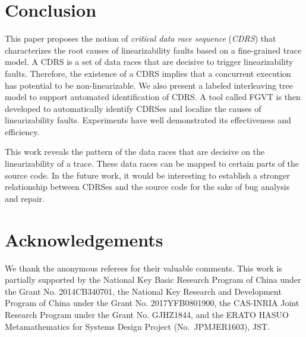 \documentclass[runningheads]{llncs}
\begin{document}

\section{Conclusion}\label{sec:conclusion}
This paper proposes the notion of \textit{critical data race sequence} (\textit{CDRS}) that characterizes the root causes of linearizability faults based on a fine-grained trace model. A CDRS is a set of data races that are decisive to trigger linearizability faults. Therefore, the existence of a CDRS implies that a concurrent execution has potential to be non-linearizable. We also present a labeled interleaving tree model to support automated identification of CDRS. A tool called FGVT is then developed to automatically identify CDRSes and localize the causes of linearizability faults. Experiments have well demonstrated its effectiveness and efficiency.

This work reveals the pattern of the data races that are decisive on the linearizability of a trace. These data races can be mapped to certain parts of the source code. In the future work, it would be interesting to establish a stronger relationship between CDRSes and the source code for the sake of bug analysis and repair.

\section*{Acknowledgements}\label{sec:acknowledgement}

We thank the anonymous referees for their valuable comments. This work is partially supported by the National Key Basic Research Program of China under the Grant No. 2014CB340701, the National Key Research and Development Program of China under the Grant No. 2017YFB0801900, the CAS-INRIA Joint Research Program under the Grant No. GJHZ1844, and the ERATO HASUO Metamathematics for Systems Design Project (No.~{JPMJER1603}), JST.

%
%
 
 
%
\end{document}
